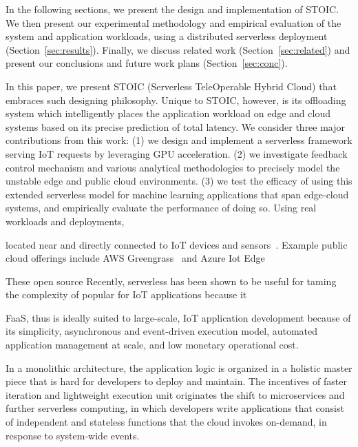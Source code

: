 In the following sections, we present the design and implementation of STOIC. We then present our experimental methodology and empirical evaluation of the system and application workloads, using a distributed serverless deployment (Section~\ref{sec:results}). Finally, we discuss related work (Section~\ref{sec:related}) and present our conclusions and future work plans (Section~\ref{sec:conc}).









\iffalse
In this paper, we present STOIC (Serverless TeleOperable Hybrid Cloud) that embraces such designing philosophy. Unique to STOIC, however, is its offloading system which intelligently places the application workload on edge and cloud systems based on its precise prediction of total latency. We consider three major contributions from this work: (1) we design and implement a serverless framework serving IoT requests by leveraging GPU acceleration. (2) we investigate feedback control mechanism and various analytical methodologies to precisely model the unstable edge and public cloud environments. (3) we test the efficacy of using this extended serverless model for machine learning applications that span edge-cloud systems, and empirically evaluate the performance of doing so. Using real workloads and deployments, 

located near and directly
connected to IoT devices and
sensors~\cite{edge,bonomi2012fog,cloudlets,cloudlets2012satya,verbelen2012cloudlets}.
Example public cloud offerings include AWS Greengrass~\cite{greengrassweb,awsiot-web} and
Azure Iot Edge~\cite{iotedge-web,iothub-web}


These open source Recently, serverless has been shown to be useful for taming the complexity of  popular for IoT applications because it 

FaaS, thus is ideally suited to large-scale, IoT application development because of its simplicity,
asynchronous and event-driven execution model, automated application management at scale,
and low monetary operational cost.

In a monolithic architecture, the application logic is organized in a holistic master piece that is hard for developers to deploy and maintain. The incentives of faster iteration and lightweight execution unit originates the shift to microservices and further serverless computing, in which developers write applications that consist of independent and stateless functions that the cloud invokes on-demand, in response to system-wide events.

